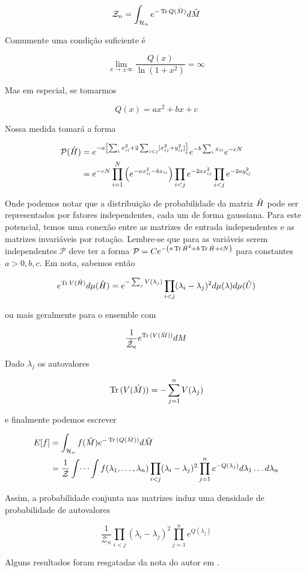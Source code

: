 \[
	\mathcal{Z}_n = \int_{\mathcal{H}_n} e^{-\operatorname{Tr}{Q(\hat M)}} d\hat M 
\]

Comumente uma condição suficiente é

\[
	\lim_{x \rightarrow \pm \infty} \frac{Q(x)}{\ln{(1+x^2)}} = \infty
\]

Mas em especial, se tomarmos

\[
	Q(x) = ax^2 + bx + c
\]


Nossa medida tomará a forma

\begin{align}	
	\mathcal{P}(\hat H) & = e^{-a \left[ \sum_{i} x_{ii}^2 + 2 \sum_{i < j} [x_{ij}^2 + y_{ij}^2] \right] } e^{-b \sum_{i} x_{ii}} e^{-c N} \\
	& = e^{-cN} \prod_{i=1}^{N} \left( e^{-ax^2_{ii}-bx_{ii}} \right) \prod_{i<j} e^{-2ax^2_{ij}} \prod_{i<j} e^{-2ay^2_{ij}}
\end{align}

Onde podemos notar que a distribuição de probabilidade da matriz $\hat H$ pode ser representados por fatores independentes, cada um de forma gaussiana. Para este potencial, temos uma conexão entre as matrizes de entrada independentes e as matrizes invariáveis por rotação. Lembre-se que para as variáveis serem independentes $\mathcal{P}$ deve ter a forma $\mathcal{P} = Ce^{-\left( a\operatorname{Tr}{\hat H^2} + b\operatorname{Tr}{\hat H} + cN \right)}$ para constantes $a>0, b, c$. Em nota, sabemos então

\[
e^{\operatorname{Tr}{V(\hat H)}}  d\mu(\hat H) = e^{-\sum_{j} V(\lambda_j)}  \prod_{i < j} (\lambda_i - \lambda_j)^2 d\mu(\lambda) d\mu(\hat U)
\]

ou mais geralmente para o ensemble com 

\[
	\frac{1}{{\mathcal{\tilde{Z}}}_n} e^{\operatorname{Tr}{(V(\hat M))}} dM
\]

Dado $\lambda_j$ os autovalores

\[
	\operatorname{Tr}{(V(\hat M))} = -\sum_{j=1}^{n} V(\lambda_j)
\]

e finalmente podemos escrever

\begin{align}
	E[f]& = \int_{\mathcal{H}_n} f(\hat M) e^{-\operatorname{Tr}{(Q(\hat M))}} d\hat M \\
	&  = \frac{1}{\mathcal{Z}} \int \dots \int f(\lambda_1, \dots, \lambda_n) \prod_{i < j} (\lambda_i - \lambda_j)^2 \prod_{j=1}^{n} e^{-Q(\lambda_j)} d\lambda_1 \dots d\lambda_n
\end{align}

Assim, a probabilidade conjunta nas matrizes induz uma densidade de probabilidade de autovalores

\[
	\frac{1}{\mathcal{Z}_n} \prod_{i<j} (\lambda_i - \lambda_j)^2 \prod_{j=1}^{n} e^{Q(\lambda_j)}
\]

Alguns resultados foram resgatadas da nota do autor em \cite{ArnoLectureNotes}.{\tiny }